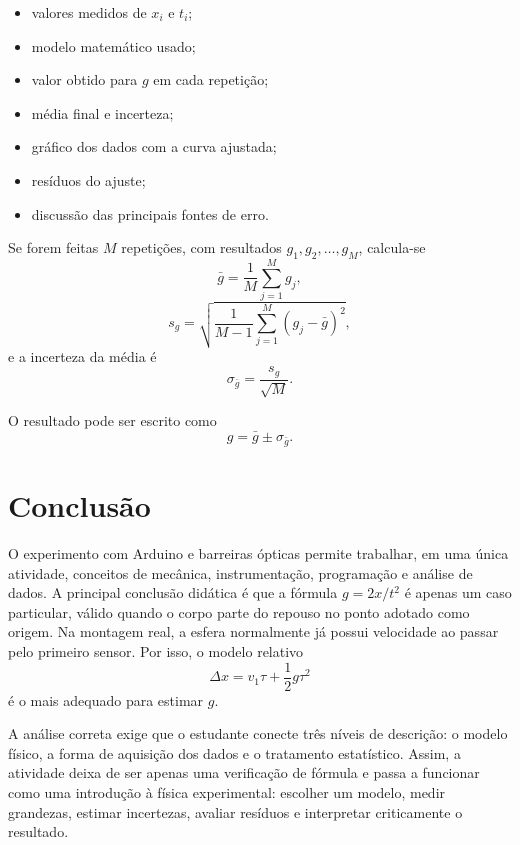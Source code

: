 \documentclass[11pt,a4paper]{article}
\begin{document}
\begin{itemize}
  \item valores medidos de $x_i$ e $t_i$;
  \item modelo matemático usado;
  \item valor obtido para $g$ em cada repetição;
  \item média final e incerteza;
  \item gráfico dos dados com a curva ajustada;
  \item resíduos do ajuste;
  \item discussão das principais fontes de erro.
\end{itemize}

Se forem feitas $M$ repetições, com resultados $g_1,g_2,\ldots,g_M$, calcula-se
\begin{equation}
  \bar g=\frac{1}{M}\sum_{j=1}^{M}g_j,
\end{equation}
\begin{equation}
  s_g=\sqrt{\frac{1}{M-1}\sum_{j=1}^{M}(g_j-\bar g)^2},
\end{equation}
e a incerteza da média é
\begin{equation}
  \sigma_{\bar g}=\frac{s_g}{\sqrt{M}}.
\end{equation}

O resultado pode ser escrito como
\begin{equation}
  g=\bar g\pm\sigma_{\bar g}.
\end{equation}

\section{Conclusão}

O experimento com Arduino e barreiras ópticas permite trabalhar, em uma única atividade, conceitos de mecânica, instrumentação, programação e análise de dados. A principal conclusão didática é que a fórmula $g=2x/t^2$ é apenas um caso particular, válido quando o corpo parte do repouso no ponto adotado como origem. Na montagem real, a esfera normalmente já possui velocidade ao passar pelo primeiro sensor. Por isso, o modelo relativo
\begin{equation}
  \Delta x=v_1\tau+\frac{1}{2}g\tau^2
\end{equation}
é o mais adequado para estimar $g$.

A análise correta exige que o estudante conecte três níveis de descrição: o modelo físico, a forma de aquisição dos dados e o tratamento estatístico. Assim, a atividade deixa de ser apenas uma verificação de fórmula e passa a funcionar como uma introdução à física experimental: escolher um modelo, medir grandezas, estimar incertezas, avaliar resíduos e interpretar criticamente o resultado.
\end{document}
